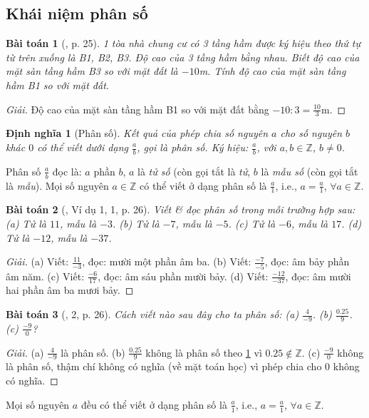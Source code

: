 \documentclass{article}
\newtheorem{baitoan}{Bài toán}
\newtheorem{dinhnghia}{Định nghĩa}
\begin{document}
\subsection{Khái niệm phân số}

\begin{baitoan}[\cite{SGK_Toan_6_Canh_Dieu_tap_2}, p. 25]
	1 tòa nhà chung cư có 3 tầng hầm được ký hiệu theo thứ tự từ trên xuống là B1, B2, B3. Độ cao của 3 tầng hầm bằng nhau. Biết độ cao của mặt sàn tầng hầm B3 so với mặt đất là $-10$\emph{m}. Tính độ cao của mặt sàn tầng hầm B1 so với mặt đất.
\end{baitoan}

\begin{proof}[Giải]
	Độ cao của mặt sàn tầng hầm B1 so với mặt đất bằng $-10:3 = \frac{10}{3}$m.
\end{proof}

\begin{dinhnghia}[Phân số]
	\label{def: fraction}
	Kết quả của phép chia số nguyên $a$ cho số nguyên $b$ khác $0$ có thể viết dưới dạng $\frac{a}{b}$, gọi là \emph{phân số}. Ký hiệu: $\frac{a}{b}$, với $a,b\in\mathbb{Z}$, $b\ne0$.
\end{dinhnghia}
Phân số $\frac{a}{b}$ đọc là: $a$ phần $b$, $a$ là \textit{tử số} (còn gọi tắt là \textit{tử}, $b$ là \textit{mẫu số} (còn gọi tắt là \textit{mẫu}). Mọi số nguyên $a\in\mathbb{Z}$ có thể viết ở dạng phân số là $\frac{a}{1}$, i.e., $a = \frac{a}{1}$, $\forall a\in\mathbb{Z}$.

\begin{baitoan}[\cite{SGK_Toan_6_Canh_Dieu_tap_2}, Ví dụ 1, 1, p. 26]
	Viết \& đọc phân số trong mỗi trường hợp sau: (a) Tử là $11$, mẫu là $-3$. (b) Tử là $-7$, mẫu là $-5$. (c) Tử là $-6$, mẫu là $17$. (d) Tử là $-12$, mẫu là $-37$.
\end{baitoan}

\begin{proof}[Giải]
	(a) Viết: $\frac{11}{-3}$, đọc: mười một phần âm ba. (b) Viết: $\frac{-7}{-5}$, đọc: âm bảy phần âm năm. (c) Viết: $\frac{-6}{17}$, đọc: âm sáu phần mười bảy. (d) Viết: $\frac{-12}{-37}$, đọc: âm mười hai phần âm ba mươi bảy.
\end{proof}

\begin{baitoan}[\cite{SGK_Toan_6_Canh_Dieu_tap_2}, 2, p. 26]
	Cách viết nào sau đây cho ta phân số: (a) $\frac{4}{-9}$. (b) $\frac{0.25}{9}$. (c) $\frac{-9}{0}$?
\end{baitoan}

\begin{proof}[Giải]
	(a) $\frac{4}{-9}$ là phân số. (b) $\frac{0.25}{9}$ không là phân số theo \ref{def: fraction} vì $0.25\notin\mathbb{Z}$. (c) $\frac{-9}{0}$ không là phân số, thậm chí không có nghĩa (về mặt toán học) vì phép chia cho $0$ không có nghĩa.
\end{proof}
Mọi số nguyên $a$ đều có thể viết ở dạng phân số là $\frac{a}{1}$, i.e., $a = \frac{a}{1}$, $\forall a\in\mathbb{Z}$.
\end{document}
